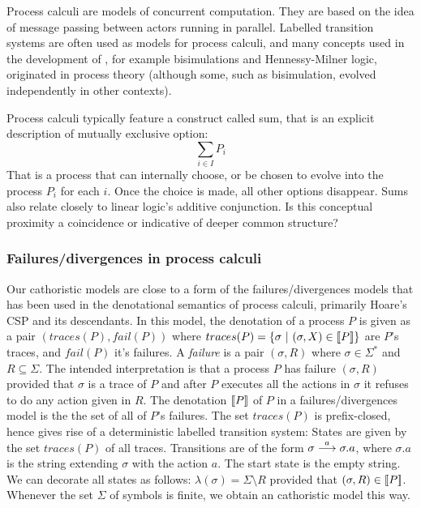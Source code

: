 Process calculi are models of concurrent computation.  They are based
on the idea of message passing between actors running in parallel.
Labelled transition systems are often used as models for process
calculi, and many concepts used in the development of \cathoristic{},
for example bisimulations and Hennessy-Milner logic, originated in
process theory (although some, such as bisimulation, evolved
independently in other contexts).

Process calculi typically feature a construct called sum, that is an
explicit description of mutually exclusive option:
\[
     \sum_{i \in I} P_i
\]
That is a process that can internally choose, or be chosen to evolve
into the process $P_i$ for each $i$. Once the choice is made, all
other options disappear.  Sums also relate closely to linear logic's
additive conjunction. Is this conceptual proximity a coincidence or
indicative of deeper common structure?


\subsubsection{Failures/divergences in process calculi}

Our cathoristic models are close to a form of the failures/divergences
models that has been used in the denotational semantics of process
calculi, primarily Hoare's CSP \cite{HoareC:comseq,RoscoeAW:theapoc}
and its descendants.  In this model, the denotation of a process $P$
is given as a pair $(traces(P), fail(P))$ where $traces(P) = \{
\sigma\ |\ (\sigma, X) \in \lbrack\!\lbrack P \rbrack\!\rbrack \}$ are $P$'s traces, and
$fail(P)$ it's failures.  A \emph{failure} is a pair $(\sigma, R)$
where $\sigma \in \Sigma^*$ and $R \subseteq \Sigma$. The intended
interpretation is that a process $P$ has failure $(\sigma, R)$
provided that $\sigma$ is a trace of $P$ and after $P$ executes all
the actions in $\sigma$ it refuses to do any action given in $R$. The
denotation $\lbrack\!\lbrack P \rbrack\!\rbrack$ of $P$ in a failures/divergences model is the
the set of all of $P$'s failures. The set $ traces(P)$ is
prefix-closed, hence gives rise of a deterministic labelled transition
system: States are given by the set $traces(P)$ of all traces.
Transitions are of the form $\sigma \stackrel{a}{\longrightarrow} \sigma.a$, where
$\sigma.a$ is the string extending $\sigma$ with the action $a$.  The
start state is the empty string.  We can decorate all states as
follows: $ \lambda (\sigma) = \Sigma \setminus R $ provided that
$(\sigma, R) \in \lbrack\!\lbrack P \rbrack\!\rbrack$.  Whenever the set $\Sigma$ of symbols is
finite, we obtain an cathoristic model this way.

